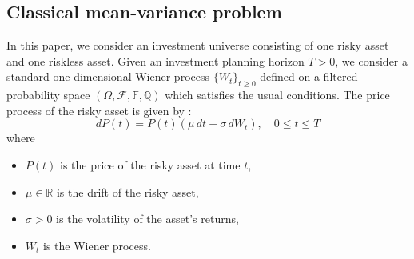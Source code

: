 \documentclass[oneside, a4paper, onecolumn, 11pt]{article}
\begin{document}
\subsection{Classical mean-variance problem}
In this paper, we consider an investment universe consisting of one risky asset and one riskless asset. 
Given an investment planning horizon \( T > 0 \), we consider a standard one-dimensional Wiener process  \( \{ W_t \}_{t \geq 0} \) defined on a filtered probability space \( (\Omega, \mathcal{F}, \mathbb{F}, \mathbb{Q}) \) which satisfies the usual conditions. The price process of the risky asset is given by :
\begin{equation} 
dP(t) = P(t) (\mu \, dt + \sigma \, dW_t), \quad 0 \leq t \leq T 
\label{eq:price}
\end{equation}
where 
\begin{itemize}
    \item \( P(t) \) is the price of the risky asset at time \( t \),
    \item \( \mu \in \mathbb{R} \) is the drift of the risky asset,
    \item \( \sigma > 0 \) is the volatility of the asset’s returns,
    \item \( W_t \) is the Wiener process.
\end{itemize}
\end{document}
